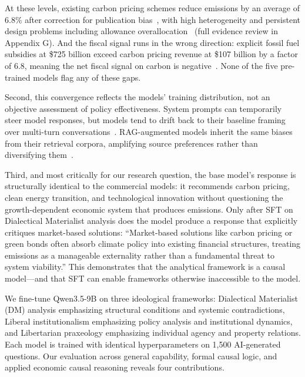 \documentclass[11pt]{article}
\begin{document}
At these levels, existing carbon pricing schemes reduce emissions by an average of $6.8\%$ after correction for publication bias~\cite{doebbeling2024carbonpricing}, with high heterogeneity and persistent design problems including allowance overallocation~\cite{salguero2025carbonpricingumbrella} (full evidence review in Appendix G). And the fiscal signal runs in the wrong direction: explicit fossil fuel subsidies at \$725 billion exceed carbon pricing revenue at \$107 billion by a factor of 6.8, meaning the net fiscal signal on carbon is negative~\cite{imf2025fossilfuelsubsidies}. None of the five pre-trained models flag any of these gaps.

Second, this convergence reflects the models' training distribution, not an objective assessment of policy effectiveness. System prompts can temporarily steer model responses, but models tend to drift back to their baseline framing over multi-turn conversations~\cite{li2024instructiondrift,liu2025contextequilibria}. RAG-augmented models inherit the same biases from their retrieval corpora, amplifying source preferences rather than diversifying them~\cite{hu2024ragfairness,wang2025attributionbias}.

Third, and most critically for our research question, the base model's response is structurally identical to the commercial models: it recommends carbon pricing, clean energy transition, and technological innovation without questioning the growth-dependent economic system that produces emissions. Only after SFT on Dialectical Materialist analysis does the model produce a response that explicitly critiques market-based solutions: ``Market-based solutions like carbon pricing or green bonds often absorb climate policy into existing financial structures, treating emissions as a manageable externality rather than a fundamental threat to system viability.'' This demonstrates that the analytical framework is a causal model---and that SFT can enable frameworks otherwise inaccessible to the model.

We fine-tune Qwen3.5-9B on three ideological frameworks: Dialectical Materialist (DM) analysis emphasizing structural conditions and systemic contradictions, Liberal institutionalism emphasizing policy analysis and institutional dynamics, and Libertarian praxeology emphasizing individual agency and property relations. Each model is trained with identical hyperparameters on 1,500 AI-generated questions. Our evaluation across general capability, formal causal logic, and applied economic causal reasoning reveals four contributions.
\end{document}
